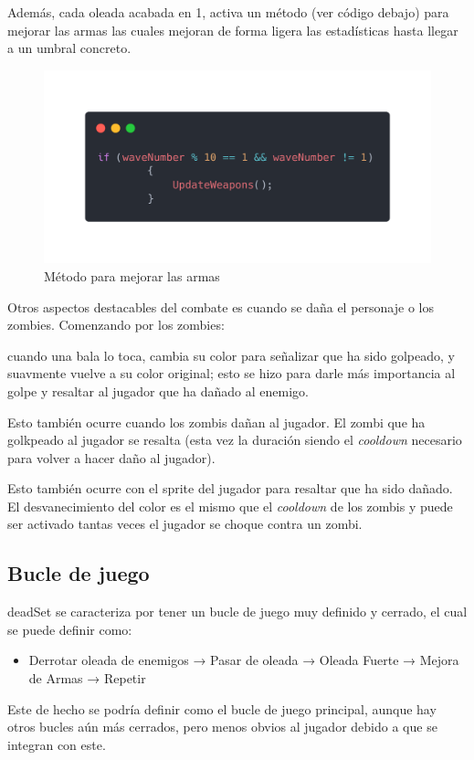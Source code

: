 \documentclass[12pt]{article}
\begin{document}
        
        Además, cada oleada acabada en 1, activa un método (ver código debajo) para mejorar las armas las cuales mejoran de forma ligera las estadísticas hasta llegar a un umbral concreto.
        
    \begin{figure}[H]
        \centering
        \includegraphics[width=\textwidth]{Images/Menuprincipal/wavnumber.png}
        \caption{Método para mejorar las armas}
    \end{figure}

    Otros aspectos destacables del combate es cuando se daña el personaje o los zombies. Comenzando por los zombies: 
    
    cuando una bala lo toca, cambia su color para señalizar que ha sido golpeado, y suavmente vuelve a su color original; esto se hizo para darle más importancia al golpe y resaltar al jugador que ha dañado al enemigo. 

    Esto también ocurre cuando los zombis dañan al jugador. El zombi que ha golkpeado al jugador se resalta (esta vez la duración siendo el \textit{cooldown} necesario para volver a hacer daño al jugador). 
    
    Esto también ocurre con el sprite del jugador para resaltar que ha sido dañado. El desvanecimiento del color es el mismo que el \textit{cooldown} de los zombis y puede ser activado tantas veces el jugador se choque contra un zombi.

        \subsection{Bucle de juego}
        \textunderscore deadSet se caracteriza por tener un bucle de juego muy definido y cerrado, el cual se puede definir como:
        
        \begin{itemize}
            \item Derrotar oleada de enemigos → Pasar de oleada → Oleada Fuerte → Mejora de Armas → Repetir
        \end{itemize}
        Este de hecho se podría definir como el bucle de juego principal, aunque hay otros bucles aún más cerrados, pero menos obvios al jugador debido a que se integran con este. 
        
\end{document}
